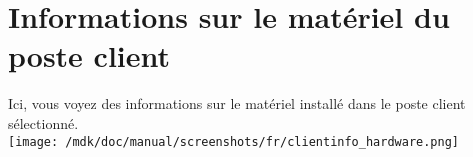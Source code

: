 \section{Informations sur le mat\'eriel du poste client}Ici, vous voyez des informations sur le mat\'eriel install\'e dans le poste client s\'electionn\'e.\\
\texttt{[image: /mdk/doc/manual/screenshots/fr/clientinfo\_hardware.png]} \\
